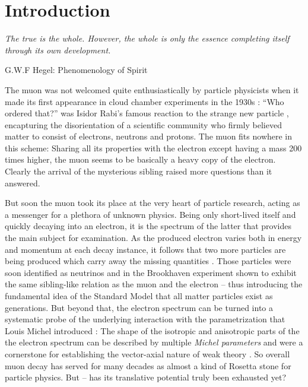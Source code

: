 \chapter{Introduction}
\textit{The true is the whole. However, the whole is only the essence completing itself through its own development.}\par
\begin{raggedleft}
    G.W.F Hegel: Phenomenology of Spirit \cite[p.11]{hegel1977pheno}\par
\end{raggedleft} \vspace{0.8cm}
The muon was not welcomed quite enthusiastically by particle physicists when it made its first appearance in cloud chamber experiments in the 1930s \cite{neddermeyer1937note}: \enquote{Who ordered that?} was Isidor Rabi's famous reaction to the strange new particle \cite{bartusiak1987who}, encapturing the disorientation of a scientific community who firmly believed matter to consist of electrons, neutrons and protons. The muon fits nowhere in this scheme: Sharing all its properties with the electron except having a mass 200 times higher, the muon seems to be basically a heavy copy of the electron. Clearly the arrival of the mysterious sibling raised more questions than it answered.

But soon the muon took its place at the very heart of particle research, acting as a messenger for a plethora of unknown physics. Being only short-lived itself and quickly decaying into an electron, it is the spectrum of the latter that provides the main subject for examination. As the produced electron varies both in energy and momentum at each decay instance, it follows that two more particles are being produced which carry away the missing quantities \cite{steinberger1949range}. Those particles were soon identified as neutrinos and in the Brookhaven experiment \cite{danby1962neutrinos} shown to exhibit the same sibling-like relation as the muon and the electron -- thus introducing the fundamental idea of the Standard Model that all matter particles exist as generations. But beyond that, the electron spectrum can be turned into a systematic probe of the underlying interaction with the parametrization that Louis Michel introduced \cite{michel1950interaction}: The shape of the isotropic and anisotropic parts of the the electron spectrum can be described by multiple \textit{Michel parameters} and were a cornerstone for establishing the vector-axial nature of weak theory \cite{sudarshan1958chirality,feynman1958theory}. So overall muon decay has served for many decades as almost a kind of Rosetta stone for particle physics. But -- has its translative potential truly been exhausted yet?

